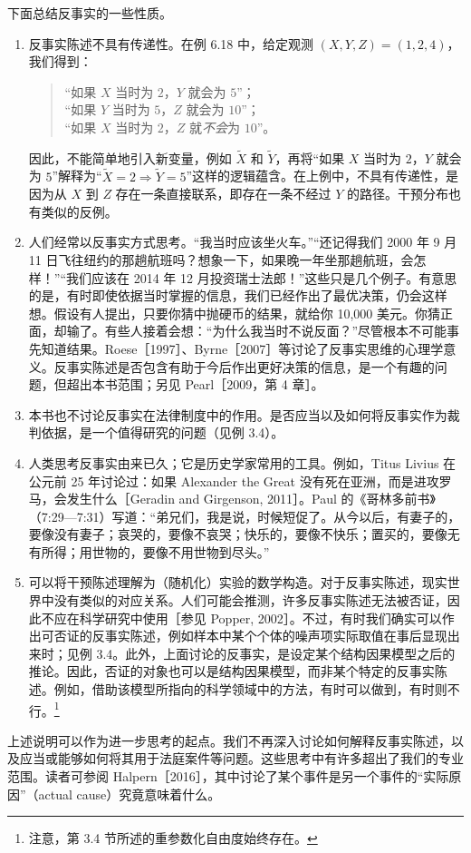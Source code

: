 下面总结反事实的一些性质。

\begin{remark}
\begin{enumerate}[label=(\roman*)]
 \item 反事实陈述不具有传递性。在例 6.18 中，给定观测 $(X,Y,Z)=(1,2,4)$，我们得到：
 \begin{quote}
 “如果 $X$ 当时为 $2$，$Y$ 就会为 $5$”；\\
 “如果 $Y$ 当时为 $5$，$Z$ 就会为 $10$”；\\
 “如果 $X$ 当时为 $2$，$Z$ 就\emph{不会}为 $10$”。
 \end{quote}
 因此，不能简单地引入新变量，例如 $\widetilde X$ 和 $\widetilde Y$，再将“如果 $X$ 当时为 $2$，$Y$ 就会为 $5$”解释为“$\widetilde X=2\Rightarrow\widetilde Y=5$”这样的逻辑蕴含。在上例中，不具有传递性，是因为从 $X$ 到 $Z$ 存在一条直接联系，即存在一条不经过 $Y$ 的路径。干预分布也有类似的反例。

 \item 人们经常以反事实方式思考。“我当时应该坐火车。”“还记得我们 2000 年 9 月 11 日飞往纽约的那趟航班吗？想象一下，如果晚一年坐那趟航班，会怎样！”“我们应该在 2014 年 12 月投资瑞士法郎！”这些只是几个例子。有意思的是，有时即使依据当时掌握的信息，我们已经作出了最优决策，仍会这样想。假设有人提出，只要你猜中抛硬币的结果，就给你 10,000 美元。你猜正面，却输了。有些人接着会想：“为什么我当时不说反面？”尽管根本不可能事先知道结果。Roese［1997］、Byrne［2007］等讨论了反事实思维的心理学意义。反事实陈述是否包含有助于今后作出更好决策的信息，是一个有趣的问题，但超出本书范围；另见 Pearl［2009，第 4 章］。

 \item 本书也不讨论反事实在法律制度中的作用。是否应当以及如何将反事实作为裁判依据，是一个值得研究的问题（见例 3.4）。

 \item 人类思考反事实由来已久；它是历史学家常用的工具。例如，Titus Livius 在公元前 25 年讨论过：如果 Alexander the Great 没有死在亚洲，而是进攻罗马，会发生什么［Geradin and Girgenson, 2011］。Paul 的《哥林多前书》（7:29—7:31）写道：“弟兄们，我是说，时候短促了。从今以后，有妻子的，要像没有妻子；哀哭的，要像不哀哭；快乐的，要像不快乐；置买的，要像无有所得；用世物的，要像不用世物到尽头。”

 \item 可以将干预陈述理解为（随机化）实验的数学构造。对于反事实陈述，现实世界中没有类似的对应关系。人们可能会推测，许多反事实陈述无法被否证，因此不应在科学研究中使用［参见 Popper, 2002］。不过，有时我们确实可以作出可否证的反事实陈述，例如样本中某个个体的噪声项实际取值在事后显现出来时；见例 3.4。此外，上面讨论的反事实，是设定某个结构因果模型之后的推论。因此，否证的对象也可以是结构因果模型，而非某个特定的反事实陈述。例如，借助该模型所指向的科学领域中的方法，有时可以做到，有时则不行。\footnote{注意，第 3.4 节所述的重参数化自由度始终存在。}
\end{enumerate}
\end{remark}

上述说明可以作为进一步思考的起点。我们不再深入讨论如何解释反事实陈述，以及应当或能够如何将其用于法庭案件等问题。这些思考中有许多超出了我们的专业范围。读者可参阅 Halpern［2016］，其中讨论了某个事件是另一个事件的“实际原因”（actual cause）究竟意味着什么。
\FloatBarrier
